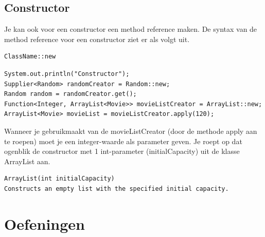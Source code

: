 \documentclass{tstextbook}
\begin{document}
\subsection{Constructor}

Je kan ook voor een constructor een method reference maken. De syntax van de method reference voor een constructor ziet er als volgt uit.

\begin{verbatim}
ClassName::new
\end{verbatim}

\begin{lstlisting}
System.out.println("Constructor");
Supplier<Random> randomCreator = Random::new;
Random random = randomCreator.get();
Function<Integer, ArrayList<Movie>> movieListCreator = ArrayList::new;
ArrayList<Movie> movieList = movieListCreator.apply(120);
\end{lstlisting}

Wanneer je gebruikmaakt van de movieListCreator (door de methode apply aan te roepen) moet je een integer-waarde als parameter geven. 
Je roept op dat ogenblik de constructor met 1 int-parameter (initialCapacity) uit de klasse ArrayList aan.

\begin{verbatim}
ArrayList(int initialCapacity)
Constructs an empty list with the specified initial capacity.
\end{verbatim} 
\vspace{4cm}

\section{Oefeningen}
\end{document}
